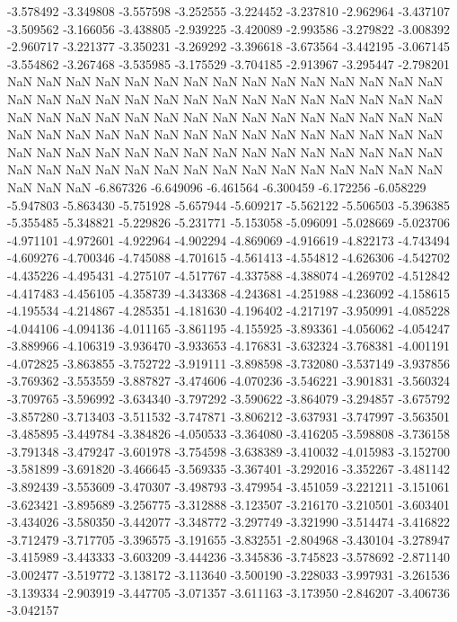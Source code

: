 -3.578492
-3.349808
-3.557598
-3.252555
-3.224452
-3.237810
-2.962964
-3.437107
-3.509562
-3.166056
-3.438805
-2.939225
-3.420089
-2.993586
-3.279822
-3.008392
-2.960717
-3.221377
-3.350231
-3.269292
-3.396618
-3.673564
-3.442195
-3.067145
-3.554862
-3.267468
-3.535985
-3.175529
-3.704185
-2.913967
-3.295447
-2.798201
NaN
NaN
NaN
NaN
NaN
NaN
NaN
NaN
NaN
NaN
NaN
NaN
NaN
NaN
NaN
NaN
NaN
NaN
NaN
NaN
NaN
NaN
NaN
NaN
NaN
NaN
NaN
NaN
NaN
NaN
NaN
NaN
NaN
NaN
NaN
NaN
NaN
NaN
NaN
NaN
NaN
NaN
NaN
NaN
NaN
NaN
NaN
NaN
NaN
NaN
NaN
NaN
NaN
NaN
NaN
NaN
NaN
NaN
NaN
NaN
NaN
NaN
NaN
NaN
NaN
NaN
NaN
NaN
NaN
NaN
NaN
NaN
NaN
NaN
NaN
NaN
NaN
NaN
NaN
NaN
NaN
NaN
NaN
NaN
NaN
NaN
NaN
NaN
NaN
NaN
NaN
NaN
NaN
-6.867326
-6.649096
-6.461564
-6.300459
-6.172256
-6.058229
-5.947803
-5.863430
-5.751928
-5.657944
-5.609217
-5.562122
-5.506503
-5.396385
-5.355485
-5.348821
-5.229826
-5.231771
-5.153058
-5.096091
-5.028669
-5.023706
-4.971101
-4.972601
-4.922964
-4.902294
-4.869069
-4.916619
-4.822173
-4.743494
-4.609276
-4.700346
-4.745088
-4.701615
-4.561413
-4.554812
-4.626306
-4.542702
-4.435226
-4.495431
-4.275107
-4.517767
-4.337588
-4.388074
-4.269702
-4.512842
-4.417483
-4.456105
-4.358739
-4.343368
-4.243681
-4.251988
-4.236092
-4.158615
-4.195534
-4.214867
-4.285351
-4.181630
-4.196402
-4.217197
-3.950991
-4.085228
-4.044106
-4.094136
-4.011165
-3.861195
-4.155925
-3.893361
-4.056062
-4.054247
-3.889966
-4.106319
-3.936470
-3.933653
-4.176831
-3.632324
-3.768381
-4.001191
-4.072825
-3.863855
-3.752722
-3.919111
-3.898598
-3.732080
-3.537149
-3.937856
-3.769362
-3.553559
-3.887827
-3.474606
-4.070236
-3.546221
-3.901831
-3.560324
-3.709765
-3.596992
-3.634340
-3.797292
-3.590622
-3.864079
-3.294857
-3.675792
-3.857280
-3.713403
-3.511532
-3.747871
-3.806212
-3.637931
-3.747997
-3.563501
-3.485895
-3.449784
-3.384826
-4.050533
-3.364080
-3.416205
-3.598808
-3.736158
-3.791348
-3.479247
-3.601978
-3.754598
-3.638389
-3.410032
-4.015983
-3.152700
-3.581899
-3.691820
-3.466645
-3.569335
-3.367401
-3.292016
-3.352267
-3.481142
-3.892439
-3.553609
-3.470307
-3.498793
-3.479954
-3.451059
-3.221211
-3.151061
-3.623421
-3.895689
-3.256775
-3.312888
-3.123507
-3.216170
-3.210501
-3.603401
-3.434026
-3.580350
-3.442077
-3.348772
-3.297749
-3.321990
-3.514474
-3.416822
-3.712479
-3.717705
-3.396575
-3.191655
-3.832551
-2.804968
-3.430104
-3.278947
-3.415989
-3.443333
-3.603209
-3.444236
-3.345836
-3.745823
-3.578692
-2.871140
-3.002477
-3.519772
-3.138172
-3.113640
-3.500190
-3.228033
-3.997931
-3.261536
-3.139334
-2.903919
-3.447705
-3.071357
-3.611163
-3.173950
-2.846207
-3.406736
-3.042157
